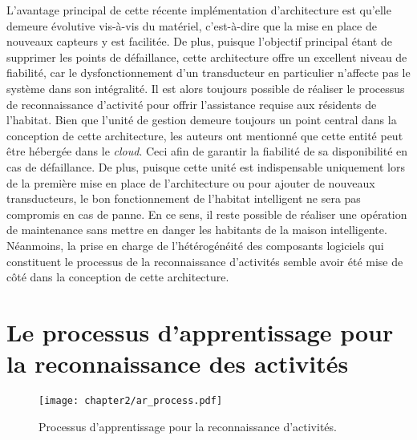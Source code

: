 L'avantage principal de cette récente implémentation d'architecture est qu'elle demeure évolutive vis-à-vis du matériel, c'est-à-dire que la mise en place de nouveaux capteurs y est facilitée. De plus, puisque l'objectif principal étant de supprimer les points de défaillance, cette architecture offre un excellent niveau de fiabilité, car le dysfonctionnement d'un transducteur en particulier n'affecte pas le système dans son intégralité. Il est alors toujours possible de réaliser le processus de reconnaissance d'activité pour offrir l'assistance requise aux résidents de l'habitat. Bien que l'unité de gestion demeure toujours un point central dans la conception de cette architecture, les auteurs ont mentionné que cette entité peut être hébergée dans le \textit{cloud}. Ceci afin de garantir la fiabilité de sa disponibilité en cas de défaillance. De plus, puisque cette unité est indispensable uniquement lors de la première mise en place de l'architecture ou pour ajouter de nouveaux transducteurs, le bon fonctionnement de l'habitat intelligent ne sera pas compromis en cas de panne. En ce sens, il reste possible de réaliser une opération de maintenance sans mettre en danger les habitants de la maison intelligente. Néanmoins, la prise en charge de l'hétérogénéité des composants logiciels qui constituent le processus de la reconnaissance d'activités semble avoir été mise de côté dans la conception de cette architecture.

\section{Le processus d'apprentissage pour la reconnaissance des activités}

\begin{figure}[b!]
	\centering
	\texttt{[image: chapter2/ar\_process.pdf]}
	\caption{Processus d'apprentissage pour la reconnaissance d'activités.}
	\label{fig:ar_process}
\end{figure}

